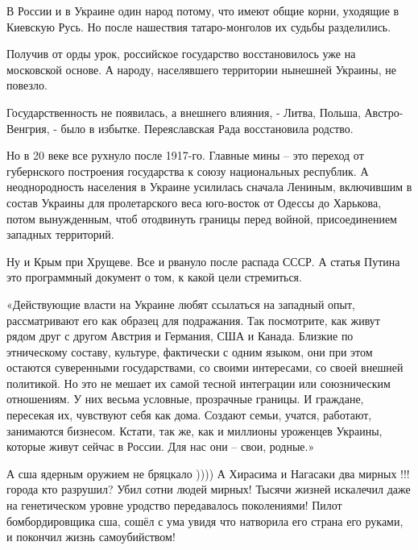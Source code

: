 \begin{itemize}

В России и в Украине один народ потому, что имеют общие корни, уходящие в
Киевскую Русь. Но после нашествия татаро-монголов их судьбы разделились.

Получив от орды урок, российское государство восстановилось уже на московской
основе. А народу, населявшего территории нынешней Украины, не повезло.

Государственность не появилась, а внешнего влияния, - Литва, Польша,
Австро-Венгрия, - было в избытке. Переяславская Рада восстановила родство. 

Но в 20 веке все рухнуло после 1917-го. Главные мины – это переход от
губернского построения государства к союзу национальных республик. А
неоднородность населения в Украине усилилась сначала Лениным, включившим в
состав Украины для пролетарского веса юго-восток от Одессы до Харькова, потом
вынужденным, чтоб отодвинуть границы перед войной, присоединением западных
территорий. 

Ну и Крым при Хрущеве. Все и рвануло после распада СССР. А статья Путина это
программный документ о том, к какой цели стремиться.

«Действующие власти на Украине любят ссылаться на западный опыт, рассматривают
его как образец для подражания. Так посмотрите, как живут рядом друг с другом
Австрия и Германия, США и Канада. Близкие по этническому составу, культуре,
фактически с одним языком, они при этом остаются суверенными государствами, со
своими интересами, со своей внешней политикой. Но это не мешает их самой тесной
интеграции или союзническим отношениям. У них весьма условные, прозрачные
границы. И граждане, пересекая их, чувствуют себя как дома. Создают семьи,
учатся, работают, занимаются бизнесом. Кстати, так же, как и миллионы уроженцев
Украины, которые живут сейчас в России. Для нас они – свои, родные.»

 

А сша ядерным оружием не бряцкало )))) А Хирасима и Нагасаки два мирных !!!
города кто разрушил? Убил сотни людей мирных! Тысячи жизней искалечил даже на
генетическом уровне уродство передавалось поколениями! Пилот бомбордировщика
сша, сошёл с ума увидя что натворила его страна его руками, и покончил жизнь
самоубийством!


\end{itemize}
